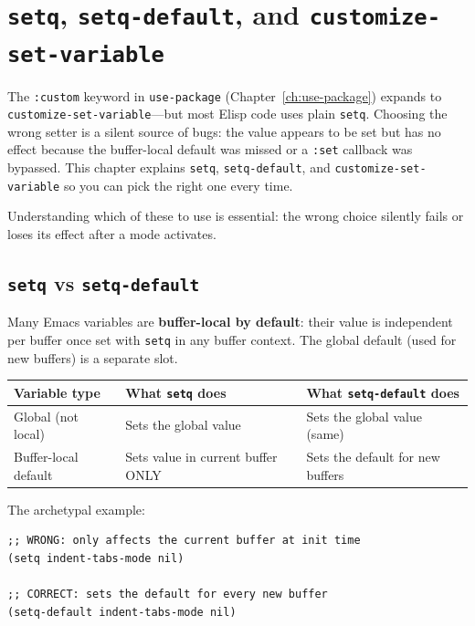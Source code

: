 \chapter{\texttt{setq}, \texttt{setq-default}, and \texttt{customize-set-variable}}
\label{ch:setq}
\minitoc\label{setq-setq-default-and-customize-set-variable}

The \texttt{:custom} keyword in \texttt{use-package}
(Chapter~\ref{ch:use-package}) expands to
\texttt{customize-set-variable}---but most Elisp code uses plain
\texttt{setq}.  Choosing the wrong setter is a silent source of bugs: the
value appears to be set but has no effect because the buffer-local
default was missed or a \texttt{:set} callback was bypassed.  This
chapter explains \texttt{setq}, \texttt{setq-default}, and
\texttt{customize-set-variable} so you can pick the right one every
time.

Understanding which of these to use is essential: the wrong choice silently fails or loses its effect after a mode activates.

\section{\texttt{setq} vs \texttt{setq-default}}\label{setq-vs-setq-default}

Many Emacs variables are \textbf{buffer-local by default}: their value is independent per buffer once set with \texttt{setq} in any buffer context. The global default (used for new buffers) is a separate slot.

\begin{longtable}[]{@{}lll@{}}
\toprule
Variable type & What \texttt{setq} does & What \texttt{setq-default} does \\
\midrule
Global (not local) & Sets the global value & Sets the global value (same) \\
Buffer-local default & Sets value in current buffer ONLY & Sets the default for new buffers \\
\bottomrule
\end{longtable}

The archetypal example:

\begin{verbatim}
;; WRONG: only affects the current buffer at init time
(setq indent-tabs-mode nil)

;; CORRECT: sets the default for every new buffer
(setq-default indent-tabs-mode nil)
\end{verbatim}

